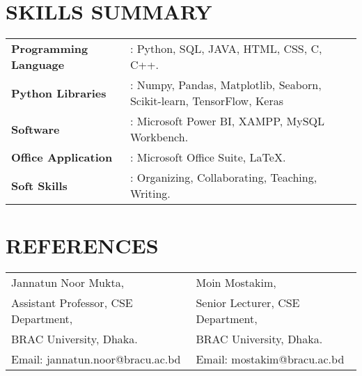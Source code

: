 \documentclass[letterpaper,11pt]{article}
\begin{document}
\section*{\textbf{SKILLS SUMMARY}}
\begin{tabular}{@{}p{} p{}}
    \textbf{Programming Language} & : Python, SQL, JAVA, HTML, CSS, C, C++.\\
    \textbf{Python Libraries} & : Numpy, Pandas, Matplotlib, Seaborn, Scikit-learn, TensorFlow, Keras\\
    \textbf{Software} & : Microsoft Power BI, XAMPP, MySQL Workbench. \\
    \textbf{Office Application} & : Microsoft Office Suite, LaTeX.\\
     \textbf{Soft Skills} & : Organizing, Collaborating, Teaching, Writing. \\
\end{tabular}


\section*{\textbf{REFERENCES}}
\begin{tabular}{@{}p{} p{}}
    Jannatun Noor Mukta, & Moin Mostakim, \\
    Assistant Professor, CSE Department, & Senior Lecturer, CSE Department, \\
    BRAC University, Dhaka. & BRAC University, Dhaka. \\
    Email: jannatun.noor@bracu.ac.bd & Email: mostakim@bracu.ac.bd \\
\end{tabular}
\end{document}

